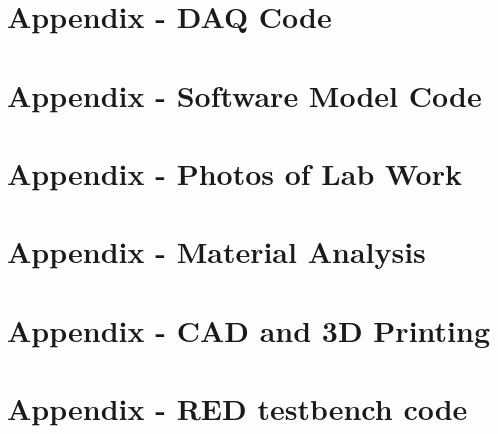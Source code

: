\documentclass[12pt,a4paper]{scrreprt}
\begin{document}
\onehalfspacing

\begin{titlepage}
    \maketitle
    \thispagestyle{empty}
\end{titlepage}

\tableofcontents
\thispagestyle{empty}
\clearpage

\listoffigures
\thispagestyle{empty}

\listoftables
\thispagestyle{empty}

\listofequations




\clearpage
















\appendix
\chapter{Appendix - DAQ Code}


\chapter{Appendix - Software Model Code}


\chapter{Appendix - Photos of Lab Work}


\chapter{Appendix - Material Analysis}
\label{app:AppendixD}


\chapter{Appendix - CAD and 3D Printing}
\label{app:AppendixE}


\chapter{Appendix - \acf{RED} testbench code}
\label{app:AppendixF}

\end{document}
